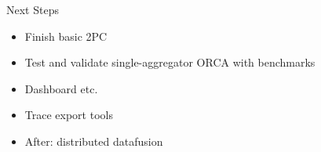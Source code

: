 \documentclass[
  ignorenonframetext,
]{beamer}
\providecommand{\tightlist}{%
  \setlength{\itemsep}{0pt}\setlength{\parskip}{0pt}}\usepackage{longtable,booktabs,array}
\begin{document}
\begin{frame}{Next Steps}
\label{next-steps}
\begin{itemize}
\tightlist
\item
  Finish basic 2PC
\item
  Test and validate single-aggregator ORCA with benchmarks
\item
  Dashboard etc.
\item
  Trace export tools
\item
  After: distributed datafusion
\end{itemize}
\end{frame}
\end{document}
